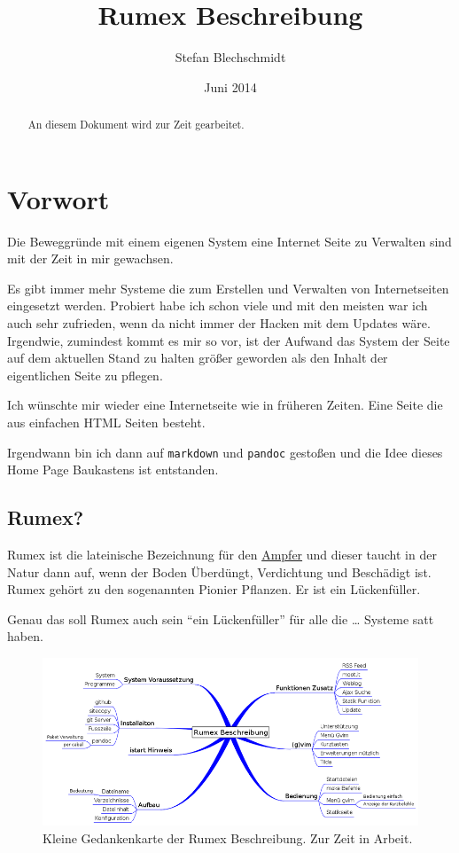 \documentclass[%
fontsize=12pt,%
parskip=half,%
version=last%
]{scrreprt}
\title{Rumex Beschreibung}
\author{Stefan Blechschmidt}
\date{Juni 2014}
\begin{document}
\VerbatimFootnotes


\maketitle

\begin{abstract}
An diesem Dokument wird zur Zeit gearbeitet.
\end{abstract}


\section{Vorwort}\label{vorwort}

Die Beweggründe mit einem eigenen System eine Internet Seite zu
Verwalten sind mit der Zeit in mir gewachsen.

Es gibt immer mehr Systeme die zum Erstellen und Verwalten von
Internetseiten eingesetzt werden. Probiert habe ich schon viele und mit
den meisten war ich auch sehr zufrieden, wenn da nicht immer der Hacken
mit dem Updates wäre. Irgendwie, zumindest kommt es mir so vor, ist der
Aufwand das System der Seite auf dem aktuellen Stand zu halten größer
geworden als den Inhalt der eigentlichen Seite zu pflegen.

Ich wünschte mir wieder eine Internetseite wie in früheren Zeiten. Eine
Seite die aus einfachen HTML Seiten besteht.

Irgendwann bin ich dann auf \texttt{markdown} und \texttt{pandoc}
gestoßen und die Idee dieses Home Page Baukastens ist entstanden.

\subsection{Rumex?}\label{rumex}

Rumex ist die lateinische Bezeichnung für den
\href{http://de.wikipedia.org/wiki/Ampfer}{Ampfer} und dieser taucht in
der Natur dann auf, wenn der Boden Überdüngt, Verdichtung und Beschädigt
ist. Rumex gehört zu den sogenannten Pionier Pflanzen. Er ist ein
Lückenfüller.

Genau das soll Rumex auch sein ``ein Lückenfüller'' für alle die
\ldots{} Systeme satt haben.

\begin{figure}[htbp]
\centering
\includegraphics{../bilder/beschreibung-vym_800_.png}
\caption{Kleine Gedankenkarte der Rumex Beschreibung. Zur Zeit in
Arbeit.}
\end{figure}
\end{document}
